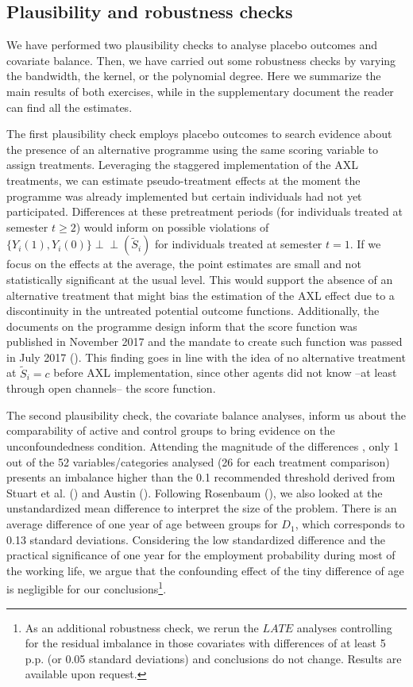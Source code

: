 \documentclass[
  11pt]{article}
\begin{document}
\subsection{Plausibility and robustness checks}\label{sec-plaurob}

We have performed two plausibility checks to analyse placebo outcomes
and covariate balance. Then, we have carried out some robustness checks
by varying the bandwidth, the kernel, or the polynomial degree. Here we
summarize the main results of both exercises, while in the supplementary
document the reader can find all the estimates.

The first plausibility check employs placebo outcomes to search evidence
about the presence of an alternative programme using the same scoring
variable to assign treatments. Leveraging the staggered implementation
of the AXL treatments, we can estimate pseudo-treatment effects at the
moment the programme was already implemented but certain individuals had
not yet participated. Differences at these pretreatment periods (for
individuals treated at semester \(t \ge 2\)) would inform on possible
violations of \(\{Y_i(1), Y_i(0)\} \perp\!\!\!\perp (\tilde{S}_i)\) for
individuals treated at semester \(t=1\). If we focus on the effects at
the average, the point estimates are small and not statistically
significant at the usual level. This would support the absence of an
alternative treatment that might bias the estimation of the AXL effect
due to a discontinuity in the untreated potential outcome functions.
Additionally, the documents on the programme design inform that the
score function was published in November 2017 and the mandate to create
such function was passed in July 2017
(). This finding
goes in line with the idea of no alternative treatment at
\(\tilde{S}_i=c\) before AXL implementation, since other agents did not
know --at least through open channels-- the score function.

The second plausibility check, the covariate balance analyses, inform us
about the comparability of active and control groups to bring evidence
on the unconfoundedness condition. Attending the magnitude of the
differences , only 1 out of the 52 variables/categories analysed (26 for
each treatment comparison) presents an imbalance higher than the 0.1
recommended threshold derived from Stuart et al.
() and Austin
(). Following Rosenbaum
(), we also looked at the
unstandardized mean difference to interpret the size of the problem.
There is an average difference of one year of age between groups for
\(D_1\), which corresponds to 0.13 standard deviations. Considering the
low standardized difference and the practical significance of one year
for the employment probability during most of the working life, we argue
that the confounding effect of the tiny difference of age is negligible
for our conclusions\footnote{As an additional robustness check, we rerun
  the \(LATE\) analyses controlling for the residual imbalance in those
  covariates with differences of at least 5 p.p. (or 0.05 standard
  deviations) and conclusions do not change. Results are available upon
  request.}.
\end{document}
